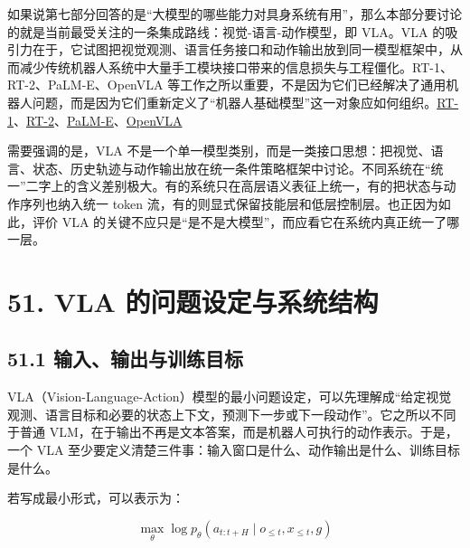

如果说第七部分回答的是“大模型的哪些能力对具身系统有用”，那么本部分要讨论的就是当前最受关注的一条集成路线：视觉-语言-动作模型，即 VLA。VLA 的吸引力在于，它试图把视觉观测、语言任务接口和动作输出放到同一模型框架中，从而减少传统机器人系统中大量手工模块接口带来的信息损失与工程僵化。RT-1、RT-2、PaLM-E、OpenVLA 等工作之所以重要，不是因为它们已经解决了通用机器人问题，而是因为它们重新定义了“机器人基础模型”这一对象应如何组织。\href{https://arxiv.org/abs/2212.06817}{RT-1}、\href{https://arxiv.org/abs/2307.15818}{RT-2}、\href{https://arxiv.org/abs/2303.03378}{PaLM-E}、\href{https://arxiv.org/abs/2406.09246}{OpenVLA}

需要强调的是，VLA 不是一个单一模型类别，而是一类接口思想：把视觉、语言、状态、历史轨迹与动作输出放在统一条件策略框架中讨论。不同系统在“统一”二字上的含义差别极大。有的系统只在高层语义表征上统一，有的把状态与动作序列也纳入统一 token 流，有的则显式保留技能层和低层控制层。也正因为如此，评价 VLA 的关键不应只是“是不是大模型”，而应看它在系统内真正统一了哪一层。

\section*{51. VLA 的问题设定与系统结构}

\subsection*{51.1 输入、输出与训练目标}


VLA（Vision-Language-Action）模型的最小问题设定，可以先理解成“给定视觉观测、语言目标和必要的状态上下文，预测下一步或下一段动作”。它之所以不同于普通 VLM，在于输出不再是文本答案，而是机器人可执行的动作表示。于是，一个 VLA 至少要定义清楚三件事：输入窗口是什么、动作输出是什么、训练目标是什么。

若写成最小形式，可以表示为：

\begingroup
\footnotesize
\begin{equation*}
\max_\theta \log p_\theta(a_{t:t+H} \mid o_{\le t}, x_{\le t}, g)
\end{equation*}
\endgroup

